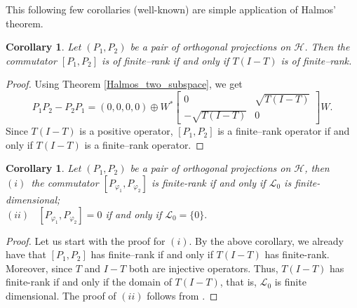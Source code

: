 \documentclass[12pt, a4 paper]{amsart}
\newcommand{\clh}{\mathcal{H}}
\newcommand{\cll}{\mathcal{L}}
\theoremstyle{definition}
\theoremstyle{plain}
\newtheorem{cor}[thm]{Corollary}
\theoremstyle{definition}
\numberwithin{equation}{section}
\let\phi=\varphi
\begin{document}
This following few corollaries (well-known) are simple application of Halmos' theorem.
\begin{cor}\label{K(I-K)}
Let $(P_1, P_2)$ be a pair of orthogonal projections on $\clh$. Then the commutator $[P_1,P_2]$ is of finite--rank if and only if $T(I - T)$ is of finite--rank.
\end{cor}
    \begin{proof}
        Using Theorem \ref{Halmos_two_subspace}, we get
        \begin{equation}\label{commutator}
        P_1P_2-P_2P_1=(0,0,0,0)\oplus W^*\begin{bmatrix}
            0 & \sqrt{T(I-T)}\\
            -\sqrt{T(I-T)}& 0
        \end{bmatrix}W.
 \end{equation}
    Since $T(I-T)$ is a positive operator, $[P_1, P_2]$ is a finite--rank operator if and only if $T(I-T)$ is a finite--rank operator.
    \end{proof}
    
      \begin{cor}\label{K_finite}
Let $(P_1, P_2)$ be a pair of orthogonal projections on $\clh$, then \\ \vspace{1mm}
$(i)$~the commutator $[P_{\phi_1}, P_{\phi_2}]$ is finite-rank if and only if $\cll_0$ is finite-dimensional;\\ \vspace{1mm}
$(ii)$~ $[P_{\phi_1}, P_{\phi_2}]=0$ if and only if $\cll_0=\{0\}.$
\end{cor}
    \begin{proof}
Let us start with the proof for $(i)$. By the above corollary, we already have that $[P_1,P_2]$ has finite--rank if and only if $T(I - T)$ has finite-rank.  Moreover, since $T$ and $I- T$ both are injective operators. Thus, $T(I-T)$ has finite-rank if and only if the domain of $T(I-T)$, that is, $\cll_0$ is finite dimensional. The proof of $(ii)$ follows from \cite[Proposition 1.5]{BS}.
\end{proof}
    
\end{document}
